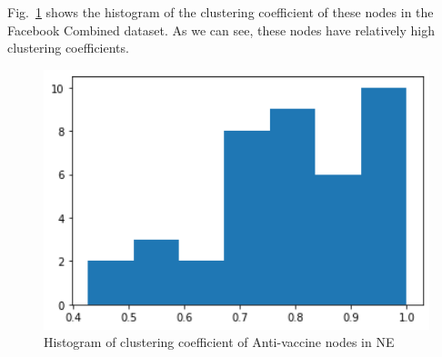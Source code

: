 






Fig.~\ref{fig:antivax_cluster_coeff} shows the histogram of the clustering coefficient of these nodes in the Facebook Combined dataset. As we can see, these nodes have relatively high clustering coefficients.


\begin{figure}[H]
    \centering
    \includegraphics[width=12cm]{figs/antivax_cluster_coeff.png}
    \caption{Histogram of clustering coefficient of Anti-vaccine nodes in NE}
    \label{fig:antivax_cluster_coeff}
\end{figure}



